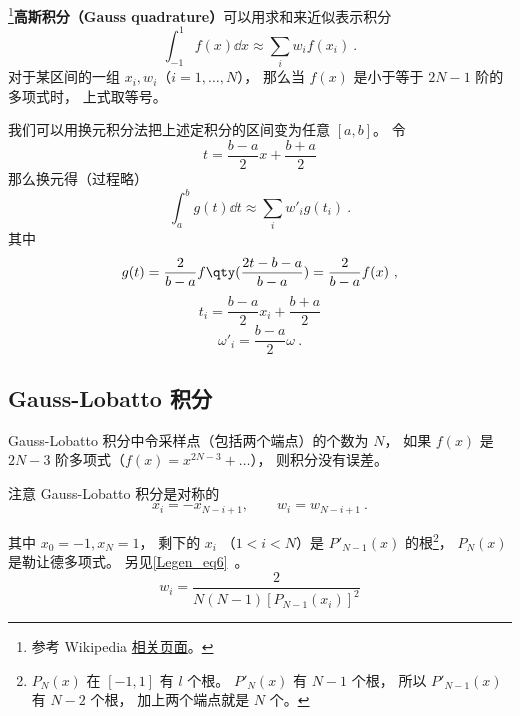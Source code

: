 
\begin{issues}
\issueAbstract
\end{issues}


\footnote{参考 Wikipedia \href{https://en.wikipedia.org/wiki/Gaussian_quadrature}{相关页面}。}\textbf{高斯积分（Gauss quadrature）}可以用求和来近似表示积分
\begin{equation}
\int_{-1}^1 f(x) \dd{x} \approx \sum_i w_i f(x_i)~.
\end{equation}
对于某区间的一组 $x_i, w_i$（$i = 1,\dots,N$）， 那么当 $f(x)$ 是小于等于 $2N-1$ 阶的多项式时， 上式取等号。

我们可以用换元积分法把上述定积分的区间变为任意 $[a,b]$。 令
\begin{equation}
t = \frac{b-a}{2}x + \frac{b+a}{2}
\end{equation}
那么换元得（过程略）
\begin{equation}
\int_a^b g(t) \dd{t} \approx \sum_i w'_i g(t_i)~.
\end{equation}
其中
\begin{equation}
g(t) = \frac{2}{b-a} f\qty(\frac{2t - b - a}{b - a}) = \frac{2}{b-a} f(x)~,
\end{equation}
\begin{equation}
t_i = \frac{b-a}{2}x_i + \frac{b+a}{2}
\end{equation}
\begin{equation}
\omega'_i = \frac{b-a}{2}\omega~.
\end{equation}


\subsection{Gauss-Lobatto 积分}
Gauss-Lobatto 积分中令采样点（包括两个端点）的个数为 $N$， 如果 $f(x)$ 是 $2N-3$ 阶多项式（$f(x) = x^{2N-3} + \dots$）， 则积分没有误差。

注意 Gauss-Lobatto 积分是对称的
\begin{equation}\label{GLquad_eq5}
x_i = -x_{N-i+1}, \qquad w_{i} = w_{N-i+1}~.
\end{equation}

其中 $x_0 = -1, x_N = 1$， 剩下的 $x_i$ （$1 < i < N$）是 $P'_{N-1}(x)$ 的根\footnote{$P_N(x)$ 在 $[-1,1]$ 有 $l$ 个根。 $P'_N(x)$ 有 $N-1$ 个根， 所以 $P'_{N-1}(x)$ 有 $N-2$ 个根， 加上两个端点就是 $N$ 个。}， $P_N(x)$ 是勒让德多项式。 另见\autoref{Legen_eq6}~。
\begin{equation} %
w_i = \frac{2}{N(N-1)[P_{N-1}(x_i)]^2}
\end{equation}

